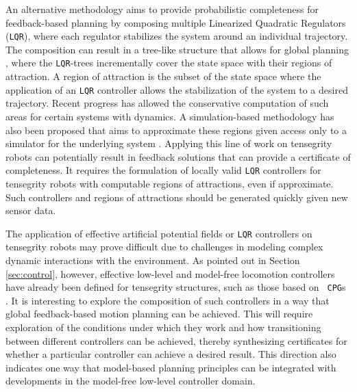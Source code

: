 An alternative methodology aims to provide probabilistic completeness
for feedback-based planning by composing multiple Linearized Quadratic
Regulators ({\tt LQR}), where each regulator stabilizes the system
around an individual trajectory. The composition can result in a
tree-like structure that allows for global planning
\cite{Tedrake2010}, where the {\tt LQR}-trees incrementally cover the
state space with their regions of attraction. A region of attraction
is the subset of the state space where the application of an {\tt LQR}
controller allows the stabilization of the system to a desired
trajectory.  Recent progress has allowed the conservative computation
of such areas for certain systems with dynamics.  A simulation-based
methodology has also been proposed that aims to approximate these
regions given access only to a simulator for the underlying system
\cite{Reist2010}. Applying this line of work on tensegrity robots can
potentially result in feedback solutions that can provide a certificate
of completeness.  It requires the formulation
of locally valid {\tt LQR} controllers for tensegrity robots with
computable regions of attractions, even if approximate. Such
controllers and regions of attractions should be generated quickly
given new sensor data.

The application of effective artificial potential fields or {\tt LQR}
controllers on tensegrity robots may prove difficult due to challenges in modeling  
complex dynamic interactions with the environment.  As pointed out in Section
\ref{sec:control}, however, effective low-level and model-free
locomotion controllers have already been defined for tensegrity
structures, such as those based on {\tt
CPG}s \cite{MirletzSoftRobotics, Caluwaerts2013rsif,
Bliss2013Central-Pattern}.  It is interesting to explore the
composition of such controllers in a way that global feedback-based
motion planning can be achieved. This will require exploration of the
conditions under which they work and how transitioning between
different controllers can be achieved, thereby synthesizing
certificates for whether a particular controller can achieve a desired
result. This direction also indicates one way that model-based
planning principles can be integrated with developments in the
model-free low-level controller domain.

\begin{comment}
\komment{

Given the development of effective controllers specifically for
tensegrity structures, such as {\tt CPG}s, one can focus on integrating
these controllers so as to solve more complex planning problems, while
providing feedback solutions with guarantees. This would require that
these controllers are able to provide some form of certificates about
their effectiveness, i.e., the conditions under which they work,
region of attraction, etc..}

\komment{Nice visuals can be generated for many of the principles
for the above set of methods.}
\end{comment}
